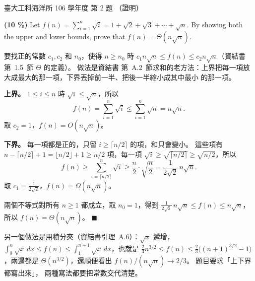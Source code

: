 \begin{pastexam}[label={px:ntu-106-esoe-ds-02}]{臺大工科海洋所 106 學年度 第 2 題}
（證明）

\textbf{(10 \%)} Let $f(n)=\sum_{i=1}^{n}\sqrt{i}=1+\sqrt{2}+\sqrt{3}+\cdots+\sqrt{n}$. By showing
both the upper and lower bounds, prove that $f(n)=\Theta(n\sqrt{n})$.
\end{pastexam}

\begin{pastsoln}
要找正的常數 $c_1, c_2$ 和 $n_0$，使得 $n \ge n_0$ 時
$c_1 n\sqrt{n} \le f(n) \le c_2 n\sqrt{n}$（資結書第~1.5~節 $\Theta$ 的定義）。 做法是資結書
第~A.2~節求和的老方法：上界把每一項放大成最大的那一項，下界丟掉前一半、把後一半縮小成其中最小
的那一項。

\textbf{上界。} $1 \le i \le n$ 時 $\sqrt{i} \le \sqrt{n}$，所以
\[
f(n) = \sum_{i=1}^{n} \sqrt{i} \le \sum_{i=1}^{n} \sqrt{n} = n\sqrt{n}.
\]
取 $c_2 = 1$，$f(n) = O(n\sqrt{n})$。

\textbf{下界。} 每一項都是正的，只留 $i \ge \lceil n/2 \rceil$ 的項，和只會變小。 這些項有
$n - \lceil n/2 \rceil + 1 = \lfloor n/2 \rfloor + 1 \ge n/2$ 項，每一項
$\sqrt{i} \ge \sqrt{\lceil n/2 \rceil} \ge \sqrt{n/2}$，所以
\[
f(n) \ge \sum_{i=\lceil n/2 \rceil}^{n} \sqrt{i}
\ge \frac{n}{2} \cdot \sqrt{\frac{n}{2}} = \frac{1}{2\sqrt{2}}\, n\sqrt{n}.
\]
取 $c_1 = \frac{1}{2\sqrt{2}}$，$f(n) = \Omega(n\sqrt{n})$。

兩個不等式對所有 $n \ge 1$ 都成立，取 $n_0 = 1$，得到
$\frac{1}{2\sqrt{2}}\, n\sqrt{n} \le f(n) \le n\sqrt{n}$，所以 $f(n) = \Theta(n\sqrt{n})$。
\hfill$\blacksquare$

另一個做法是用積分夾（資結書引理~A.6）：$\sqrt{x}$ 遞增，
$\int_0^n \sqrt{x}\,dx \le f(n) \le \int_1^{n+1} \sqrt{x}\,dx$，也就是
$\frac{2}{3} n^{3/2} \le f(n) \le \frac{2}{3}\bigl((n+1)^{3/2} - 1\bigr)$，兩邊都是
$\Theta(n^{3/2})$，還順便看出 $f(n) / (n\sqrt{n}) \to 2/3$。 題目要求「上下界都寫出來」，
兩種寫法都要把常數交代清楚。
\end{pastsoln}
